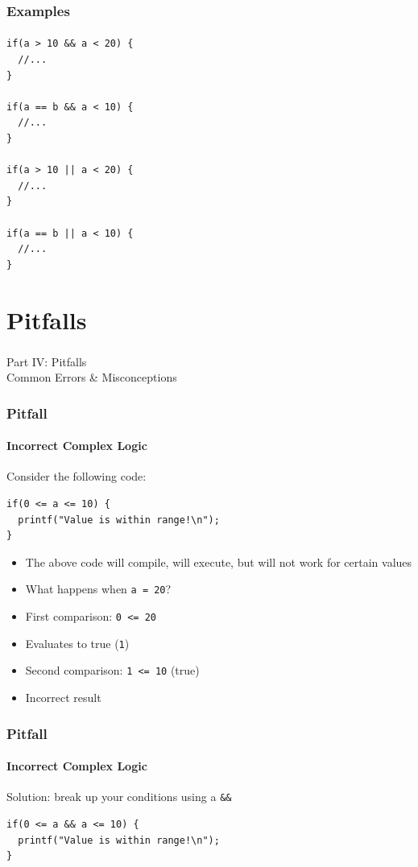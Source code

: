 \documentclass[]{beamer}
\begin{document}
\begin{frame}[fragile]
  \frametitle{Examples}
  \framesubtitle{}

\begin{verbatim}
if(a > 10 && a < 20) {
  //...
}

if(a == b && a < 10) {
  //...
}

if(a > 10 || a < 20) {
  //...
}

if(a == b || a < 10) {
  //...
}
\end{verbatim}

\end{frame}

\section{Pitfalls}

\begin{frame}
    \frametitle{}
    \framesubtitle{}
    
    \begin{center}
    {\Huge Part IV: Pitfalls}\\
    {\Large Common Errors \& Misconceptions}
    \end{center}

\end{frame}


\begin{frame}[fragile]
  \frametitle{Pitfall}
  \framesubtitle{Incorrect Complex Logic}

Consider the following code:

\begin{verbatim}
if(0 <= a <= 10) {
  printf("Value is within range!\n");
}
\end{verbatim}

\begin{itemize}[<+->]
  \item The above code will compile, will execute, but will 
    not work for certain values
  \item What happens when \texttt{a = 20}?
  \item First comparison: \texttt{0 <= 20}
  \item Evaluates to true (\texttt{1})
  \item Second comparison: \texttt{1 <= 10} (true)
  \item Incorrect result
\end{itemize}
\end{frame}

\begin{frame}[fragile]
  \frametitle{Pitfall}
  \framesubtitle{Incorrect Complex Logic}

Solution: break up your conditions using a \texttt{&&}

\begin{verbatim}
if(0 <= a && a <= 10) {
  printf("Value is within range!\n");
}
\end{verbatim}

\end{frame}
\end{document}
